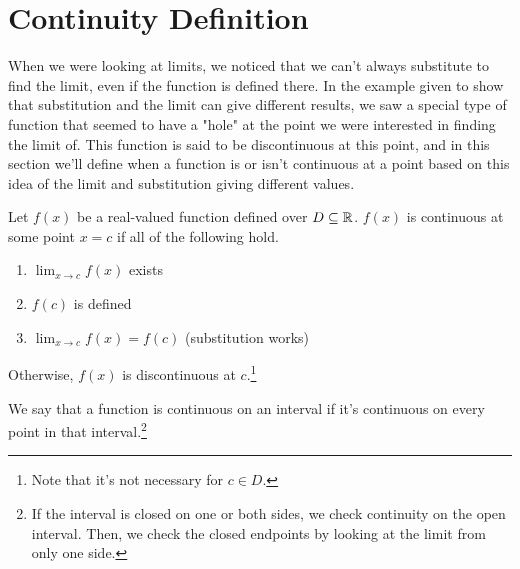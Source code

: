 \section{Continuity Definition}
When we were looking at limits, we noticed that we can't always substitute to find the limit, even if the function is defined there.
In the example given to show that substitution and the limit can give different results, we saw a special type of function that seemed to have a "hole" at the point we were interested in finding the limit of.
This function is said to be discontinuous at this point, and in this section we'll define when a function is or isn't continuous at a point based on this idea of the limit and substitution giving different values.

\begin{definition}
	Let $f(x)$ be a real-valued function defined over $D \subseteq \mathbb{R}$.
	$f(x)$ is continuous at some point $x = c$ if all of the following hold.
	\begin{enumerate}
		\item $\lim_{x \to c}{f(x)}$ exists
		\item $f(c)$ is defined
		\item $\lim_{x \to c}{f(x)} = f(c)$ (substitution works)
	\end{enumerate}
	Otherwise, $f(x)$ is discontinuous at $c$.\footnote{Note that it's not necessary for $c \in D$.}
\end{definition}


We say that a function is continuous on an interval if it's continuous on every point in that interval.\footnote{If the interval is closed on one or both sides, we check continuity on the open interval. Then, we check the closed endpoints by looking at the limit from only one side.}

